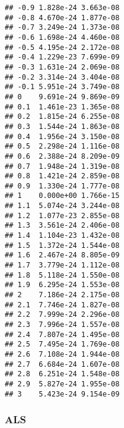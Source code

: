 \documentclass[
  12pt,
]{article}
\begin{document}
\begin{verbatim}
## -0.9 1.828e-24 3.663e-08
## -0.8 4.670e-24 1.877e-08
## -0.7 3.249e-24 1.373e-08
## -0.6 1.698e-24 4.460e-08
## -0.5 4.195e-24 2.172e-08
## -0.4 1.229e-23 7.699e-09
## -0.3 1.631e-24 2.069e-08
## -0.2 3.314e-24 3.404e-08
## -0.1 5.951e-24 3.749e-08
## 0    9.691e-24 9.869e-09
## 0.1  1.461e-23 1.365e-08
## 0.2  1.815e-24 6.255e-08
## 0.3  1.544e-24 1.863e-08
## 0.4  1.956e-24 3.150e-08
## 0.5  2.298e-24 1.116e-08
## 0.6  2.388e-24 8.209e-09
## 0.7  1.948e-24 1.319e-08
## 0.8  1.421e-24 2.859e-08
## 0.9  1.330e-24 1.777e-08
## 1    0.000e+00 1.766e-15
## 1.1  5.074e-24 3.244e-08
## 1.2  1.077e-23 2.855e-08
## 1.3  3.561e-24 2.406e-08
## 1.4  1.104e-23 1.432e-08
## 1.5  1.372e-24 1.544e-08
## 1.6  2.467e-24 8.805e-09
## 1.7  3.779e-24 1.112e-08
## 1.8  5.118e-24 1.550e-08
## 1.9  6.295e-24 1.553e-08
## 2    7.186e-24 2.175e-08
## 2.1  7.746e-24 1.827e-08
## 2.2  7.999e-24 2.296e-08
## 2.3  7.996e-24 1.557e-08
## 2.4  7.807e-24 1.495e-08
## 2.5  7.495e-24 1.769e-08
## 2.6  7.108e-24 1.944e-08
## 2.7  6.684e-24 1.607e-08
## 2.8  6.251e-24 1.548e-08
## 2.9  5.827e-24 1.955e-08
## 3    5.423e-24 9.154e-09
\end{verbatim}

\normalsize

\subsubsection{ALS}\label{als-2}

\footnotesize
\end{document}

